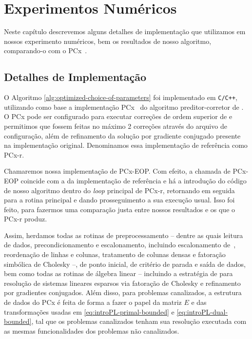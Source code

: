 \chapter{Experimentos Numéricos}
\label{chap:numerical}

Neste capítulo descrevemos alguns detalhes de implementação que utilizamos em nossos experimento numéricos, bem os resultados de nosso algoritmo, comparando-o com o  PCx~\cite{Czyzyk:1999hk}.



\section{Detalhes de Implementação}

O Algoritmo \ref{alg:optimized-choice-of-parameters} foi implementado em  \texttt{C/C++}, utilizando como base a implementação PCx~\cite{Czyzyk:1999hk} do algoritmo preditor-corretor de \textcite{Mehrotra:1992wr}. O PCx pode ser configurado para executar correções de ordem superior de \textcite{Gondzio:1996uw} e permitimos que fossem feitas no máximo 2 correções através do arquivo de configuração, além de  refinamento da solução por gradiente conjugado presente na implementação original. Denominamos essa implementação de referência como PCx-r.

  Chamaremos nossa implementação de PCx-EOP. Com efeito, a chamada de PCx-EOP coincide com a da implementação de referência e há a introdução do código de nosso algoritmo dentro do \emph{loop} principal de PCx-r,  retornando em seguida para a rotina principal e dando prosseguimento a sua execução usual. Isso foi feito, para fazermos uma comparação justa entre nossos resultados e os que o PCx-r produz. 

  Assim, herdamos todas as rotinas de preprocessamento -- dentre as quais leitura de dados, precondicionamento e escalonamento, incluindo escalonamento de~\textcite{Curtis:1972cp}, reordenação de linhas e colunas, tratamento de colunas densas e fatoração simbólica de Cholesky --, de ponto inicial, de critério de parada e saída de dados,   bem como todas as rotinas de álgebra linear -- incluindo a estratégia  de \textcite{Ng:1993uz} para resolução de sistemas lineares esparsos via fatoração de Cholesky  e refinamento por gradientes conjugados. Além disso, para problemas canalizados, a estrutura de dados do PCx é feita de forma a fazer o papel da matriz $E$ e das transformações usadas em \eqref{eq:introPL-primal-bounded} e \eqref{eq:introPL-dual-bounded}, tal que os problemas canalizados tenham sua resolução executada com  as mesmas funcionalidades dos problemas não canalizados. 



